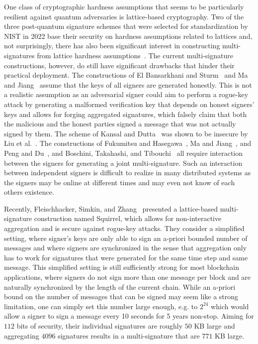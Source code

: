 One class of cryptographic hardness assumptions that seems to be particularly resilient against quantum adversaries is lattice-based cryptography.
Two of the three post-quantum signature schemes that were selected for standardization by NIST in 2022 base their security on hardness assumptions related to lattices and, not surprisingly, there has also been significant interest in constructing multi-signatures from lattice hardness assumptions~\cite{CANS:ElBStu16,FukHas19,MaJia19,PenDu20,AFRICACRYPT:KanDut20,PROVSEC:FukHas20,PKC:DOTT21,C:BosTakTib22, CCS:FleSimZha22}.
The current multi-signature constructions, however, do still have significant drawbacks that hinder their practical deployment.
The constructions of El Bansarkhani and Sturm~\cite{CANS:ElBStu16} and Ma and Jiang~\cite{MaJia19} assume that the keys of all signers are generated honestly. 
This is not a realistic assumption as an adversarial signer could aim to perform a rogue-key attack by generating a malformed verification key that depends on honest signers' keys and allows for forging aggregated signatures, which falsely claim that both the malicious and the honest parties signed a message that was not actually signed by them.
The scheme of Kansal and Dutta~\cite{AFRICACRYPT:KanDut20} was shown to be insecure by Liu et al.~\cite{EPRINT:LiuTseTso20b}.
The constructions of Fukumitsu and Hasegawa~\cite{FukHas19,PROVSEC:FukHas20}, Ma and Jiang~\cite{MaJia19}, and Peng and Du~\cite{PenDu20}, and Boschini, Takahashi, and Tibouchi~\cite{C:BosTakTib22} all require interaction between the signers for generating a joint multi-signature.
Such an interaction between independent signers is difficult to realize in many distributed systems as the signers may be online at different times and may even not know of each others existence.

Recently, Fleischhacker, Simkin, and Zhang~\cite{CCS:FleSimZha22} presented a lattice-based multi-signature construction named Squirrel, which allows for non-interactive aggregation and is secure against rogue-key attacks.
They consider a simplified setting, where signer's keys are only able to sign an a-priori bounded number of messages and where signers are synchronized in the sense that aggregation only has to work for signatures that were generated for the same time step and same message.
This simplified setting is still sufficiently strong for most blockchain applications, where signers do not sign more than one message per block and are naturally synchronized by the length of the current chain.
While an a-priori bound on the number of messages that can be signed may seem like a strong limitation, one can simply set this number large enough, e.g. to $2^{24}$ which would allow a signer to sign a message every 10 seconds for 5 years non-stop.
Aiming for $112$ bits of security, their individual signatures are roughly $50$ KB large and aggregating $4096$ signatures results in a multi-signature that are $771$ KB large.


